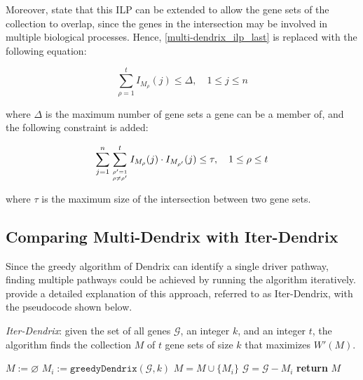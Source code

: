 Moreover, \textcite{multi-dendrix} state that this ILP can be extended to allow the gene sets of the collection to overlap, since the genes in the intersection may be involved in multiple biological processes. Hence, \cref{multi-dendrix_ilp_last} is replaced with the following equation:

\begin{equation}
    \sum_{\rho = 1}^t {I_{M_\rho}(j) \le \Delta}, \quad 1 \le j \le n
\end{equation}

where $\Delta$ is the maximum number of gene sets a gene can be a member of, and the following constraint is added:

\begin{equation}
    \sum_{j = 1}^n {\sum_{\rho' = 1 \atop \rho \neq \rho'}^t {{I_{M_\rho} (j) \cdot I_{M_{\rho'}} (j)}}} \le \tau, \quad 1 \le \rho \le t
\end{equation}

where $\tau$ is the maximum size of the intersection between two gene sets.

\subsection{Comparing Multi-Dendrix with Iter-Dendrix}

Since the greedy algorithm of Dendrix can identify a single driver pathway, finding multiple pathways could be achieved by running the algorithm iteratively. \textcite{multi-dendrix} provide a detailed explanation of this approach, referred to as Iter-Dendrix, with the pseudocode shown below.

\begin{algorithm}[H]
    \caption{
        \textit{Iter-Dendrix}: given the set of all genes $\mathcal G$, an integer $k$, and an integer $t$, the algorithm finds the collection $M$ of $t$ gene sets of size $k$ that maximizes $W'(M)$.
    }

        \label{iter-dendrix}
    \begin{algorithmic}[1]
            \State $M := \varnothing$
            \State $M_i := \texttt{greedyDendrix}(\mathcal G, k)$ 
                \State $M = M \cup \{M_i\}$
                \State $\mathcal G = \mathcal G - M_i$
            \EndFor
            \State \textbf{return} $M$
        \EndFunction
    \end{algorithmic}
\end{algorithm}

